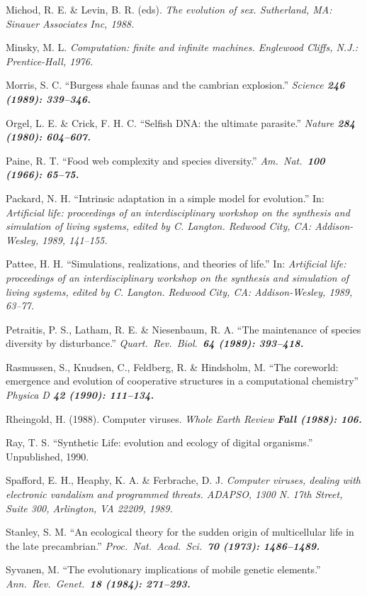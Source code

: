 Michod, R. E. \& Levin, B. R. (eds).  \it The evolution of sex\rm .
Sutherland, MA: Sinauer Associates Inc,  1988.

Minsky, M. L.  \it Computation: finite and infinite machines\rm .
Englewood Cliffs, N.J.: Prentice-Hall, 1976.

Morris, S. C.  ``Burgess shale faunas and the cambrian explosion.''
\it Science \bf 246 \rm (1989): 339--346.

Orgel, L. E. \& Crick, F. H. C.  ``Selfish DNA: the ultimate parasite.''
\it Nature \bf 284 \rm (1980): 604--607.

Paine, R. T.  ``Food web complexity and species diversity.''
\it Am.\ Nat.\ \bf 100 \rm (1966): 65--75.

Packard, N. H.  ``Intrinsic adaptation in a simple model for
evolution.''  In: \it Artificial life: proceedings of an interdisciplinary
workshop on the synthesis and simulation of living systems\rm , edited by C.
Langton.  Redwood City, CA: Addison-Wesley, 1989, 141--155.

Pattee, H. H.  ``Simulations, realizations, and theories of life.''
In: \it Artificial life: proceedings of an interdisciplinary workshop on
the synthesis and simulation of living systems\rm , edited by C. Langton.
Redwood City, CA: Addison-Wesley, 1989, 63--77.

Petraitis, P. S., Latham, R. E. \& Niesenbaum, R. A.  ``The
maintenance of species diversity by disturbance.''  \it Quart.\ Rev.\ Biol.\
\bf 64 \rm (1989): 393--418.

Rasmussen, S., Knudsen, C., Feldberg, R. \& Hindsholm, M.  ``The
coreworld: emergence and evolution of cooperative structures in a
computational chemistry''  \it Physica D \bf 42 \rm (1990): 111--134.

Rheingold, H.  (1988).  Computer viruses.  \it Whole Earth Review \bf Fall \rm
(1988): 106.

Ray, T. S.  ``Synthetic Life: evolution and ecology of digital
organisms.''  Unpublished, 1990.

Spafford, E. H., Heaphy, K. A. \& Ferbrache, D. J.  \it Computer
viruses, dealing with electronic vandalism and programmed threats\rm .
ADAPSO, 1300 N. 17th Street, Suite 300, Arlington, VA 22209, 1989.

Stanley, S. M.  ``An ecological theory for the sudden origin
of multicellular life in the late precambrian.''  \it Proc.\ Nat.\ Acad.\
Sci.\ \bf 70 \rm (1973): 1486--1489.

Syvanen, M.  ``The evolutionary implications of mobile genetic elements.''
\it Ann.\ Rev.\ Genet.\ \bf 18 \rm (1984): 271--293.

